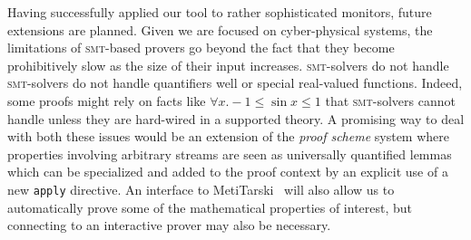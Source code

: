 Having successfully applied our tool to rather
sophisticated monitors,  future extensions are planned.  Given we are
focused on  cyber-physical systems,  the limitations
of  \textsc{smt}-based provers go  beyond the fact that they become prohibitively slow as the
size of their input increases.  \textsc{smt}-solvers do not handle 
\textsc{smt}-solvers do not handle quantifiers well or special real-valued functions. Indeed, some
proofs might rely on facts like $\forall x. -1 \leq \sin x \leq 1$
that  \textsc{smt}-solvers cannot  handle unless they are hard-wired in
a supported theory. A promising way to deal with both these issues
would be an extension of the \textit{proof scheme} system where
properties involving arbitrary streams are seen as universally
quantified lemmas which can be specialized and added to the proof
context by an explicit use of a new \texttt{apply} directive.  An interface to 
MetiTarski~\cite{AkbarpourPaulson} will also allow us to automatically
prove some of
the mathematical properties of interest, but connecting to an
interactive prover may also be necessary. 


